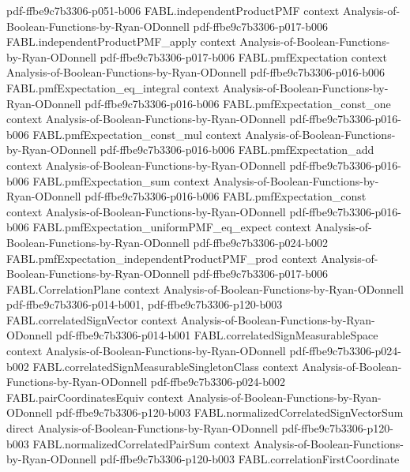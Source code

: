 \begin{theorem}
  {pdf-ffbe9c7b3306-p051-b006}
\proofstep
  {FABL.independentProductPMF}
  {context}
  {Analysis-of-Boolean-Functions-by-Ryan-ODonnell}
  {pdf-ffbe9c7b3306-p017-b006}
\proofstep
  {FABL.independentProductPMF_apply}
  {context}
  {Analysis-of-Boolean-Functions-by-Ryan-ODonnell}
  {pdf-ffbe9c7b3306-p017-b006}
\proofstep
  {FABL.pmfExpectation}
  {context}
  {Analysis-of-Boolean-Functions-by-Ryan-ODonnell}
  {pdf-ffbe9c7b3306-p016-b006}
\proofstep
  {FABL.pmfExpectation_eq_integral}
  {context}
  {Analysis-of-Boolean-Functions-by-Ryan-ODonnell}
  {pdf-ffbe9c7b3306-p016-b006}
\proofstep
  {FABL.pmfExpectation_const_one}
  {context}
  {Analysis-of-Boolean-Functions-by-Ryan-ODonnell}
  {pdf-ffbe9c7b3306-p016-b006}
\proofstep
  {FABL.pmfExpectation_const_mul}
  {context}
  {Analysis-of-Boolean-Functions-by-Ryan-ODonnell}
  {pdf-ffbe9c7b3306-p016-b006}
\proofstep
  {FABL.pmfExpectation_add}
  {context}
  {Analysis-of-Boolean-Functions-by-Ryan-ODonnell}
  {pdf-ffbe9c7b3306-p016-b006}
\proofstep
  {FABL.pmfExpectation_sum}
  {context}
  {Analysis-of-Boolean-Functions-by-Ryan-ODonnell}
  {pdf-ffbe9c7b3306-p016-b006}
\proofstep
  {FABL.pmfExpectation_const}
  {context}
  {Analysis-of-Boolean-Functions-by-Ryan-ODonnell}
  {pdf-ffbe9c7b3306-p016-b006}
\proofstep
  {FABL.pmfExpectation_uniformPMF_eq_expect}
  {context}
  {Analysis-of-Boolean-Functions-by-Ryan-ODonnell}
  {pdf-ffbe9c7b3306-p024-b002}
\proofstep
  {FABL.pmfExpectation_independentProductPMF_prod}
  {context}
  {Analysis-of-Boolean-Functions-by-Ryan-ODonnell}
  {pdf-ffbe9c7b3306-p017-b006}
\proofstep
  {FABL.CorrelationPlane}
  {context}
  {Analysis-of-Boolean-Functions-by-Ryan-ODonnell}
  {pdf-ffbe9c7b3306-p014-b001,
    pdf-ffbe9c7b3306-p120-b003}
\proofstep
  {FABL.correlatedSignVector}
  {context}
  {Analysis-of-Boolean-Functions-by-Ryan-ODonnell}
  {pdf-ffbe9c7b3306-p014-b001}
\proofstep
  {FABL.correlatedSignMeasurableSpace}
  {context}
  {Analysis-of-Boolean-Functions-by-Ryan-ODonnell}
  {pdf-ffbe9c7b3306-p024-b002}
\proofstep
  {FABL.correlatedSignMeasurableSingletonClass}
  {context}
  {Analysis-of-Boolean-Functions-by-Ryan-ODonnell}
  {pdf-ffbe9c7b3306-p024-b002}
\proofstep
  {FABL.pairCoordinatesEquiv}
  {context}
  {Analysis-of-Boolean-Functions-by-Ryan-ODonnell}
  {pdf-ffbe9c7b3306-p120-b003}
\proofstep
  {FABL.normalizedCorrelatedSignVectorSum}
  {direct}
  {Analysis-of-Boolean-Functions-by-Ryan-ODonnell}
  {pdf-ffbe9c7b3306-p120-b003}
\proofstep
  {FABL.normalizedCorrelatedPairSum}
  {context}
  {Analysis-of-Boolean-Functions-by-Ryan-ODonnell}
  {pdf-ffbe9c7b3306-p120-b003}
\proofstep
  {FABL.correlationFirstCoordinate}

\end{theorem}
